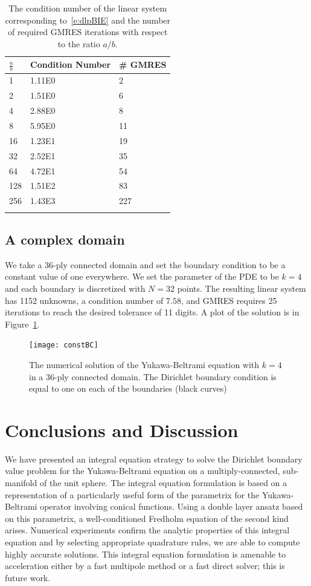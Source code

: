 \begin{table}[htps]
\caption{\label{t:example3} The condition number of the linear system
corresponding to~\eqref{e:dlpBIE} and the number of required GMRES
iterations with respect to the ratio $a/b$.}
\centering
\begin{tabular*}{0.8\textwidth}{@{\extracolsep{\fill}}lll}
$\frac{a}{b}$ & Condition Number & \# GMRES \\
\hline\noalign{\smallskip}
1   & 1.11E0 & 2   \\ 
2   & 1.51E0 & 6   \\
4   & 2.88E0 & 8   \\
8   & 5.95E0 & 11  \\
16  & 1.23E1 & 19  \\
32  & 2.52E1 & 35  \\
64  & 4.72E1 & 54  \\
128 & 1.51E2 & 83  \\
256 & 1.43E3 & 227 \\
\noalign{\smallskip}\hline
\end{tabular*}
\end{table}


\subsection{A complex domain}
We take a 36-ply connected domain and set the boundary condition to be a
constant value of one everywhere.  We set the parameter of the PDE to be
$k=4$ and each boundary is discretized with $N=32$ points.  The
resulting linear system has 1152 unknowns, a condition number of $7.58$,
and GMRES requires 25 iterations to reach the desired tolerance of 11
digits.  A plot of the solution is in Figure~\ref{f:36ply}.

\begin{figure}
  \centering
  \texttt{[image: constBC]}
  \caption{\label{f:36ply} The numerical solution of the Yukawa-Beltrami
  equation with $k=4$ in a 36-ply connected domain.  The Dirichlet
  boundary condition is equal to one on each of the boundaries (black
  curves)}
\end{figure}

\section{Conclusions and Discussion}
We have presented an  integral equation strategy to solve the Dirichlet boundary value problem for the Yukawa-Beltrami equation on a multiply-connected, sub-manifold of the unit sphere. 
The integral equation formulation is based on a representation of a particularly useful form of the parametrix for the Yukawa-Beltrami operator involving conical functions. 
Using a double layer ansatz based on this parametrix, a well-conditioned Fredholm equation of the second kind arises. Numerical experiments confirm the analytic properties of this integral equation and by selecting appropriate quadrature rules, we are able to compute highly accurate solutions. 
This integral equation formulation is amenable to acceleration either by a fast multipole method or a fast direct solver; this is future work. 

